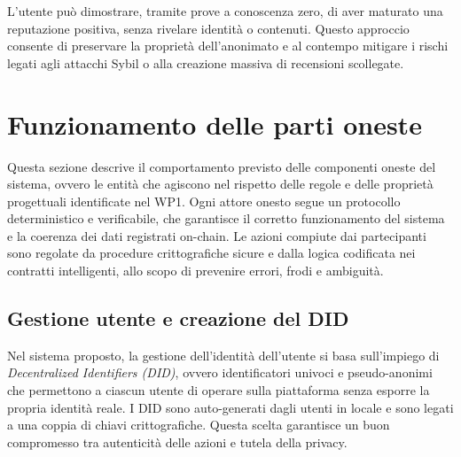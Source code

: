             \noindent L'utente può dimostrare, tramite prove a conoscenza zero, di aver maturato una reputazione positiva, senza rivelare identità o contenuti. Questo approccio consente di preservare la proprietà dell'anonimato e al contempo mitigare i rischi legati agli attacchi Sybil o alla creazione massiva di recensioni scollegate.

    \section{Funzionamento delle parti oneste}
        Questa sezione descrive il comportamento previsto delle componenti oneste del sistema, ovvero le entità che agiscono nel rispetto delle regole e delle proprietà progettuali identificate nel WP1. Ogni attore onesto segue un protocollo deterministico e verificabile, che garantisce il corretto funzionamento del sistema e la coerenza dei dati registrati on-chain. Le azioni compiute dai partecipanti sono regolate da procedure crittografiche sicure e dalla logica codificata nei contratti intelligenti, allo scopo di prevenire errori, frodi e ambiguità.
        
        \subsection{Gestione utente e creazione del DID}
            Nel sistema proposto, la gestione dell'identità dell'utente si basa sull'impiego di \textit{Decentralized Identifiers (DID)}, ovvero identificatori univoci e pseudo-anonimi che permettono a ciascun utente di operare sulla piattaforma senza esporre la propria identità reale. I DID sono auto-generati dagli utenti in locale e sono legati a una coppia di chiavi crittografiche. Questa scelta garantisce un buon compromesso tra autenticità delle azioni e tutela della privacy.

